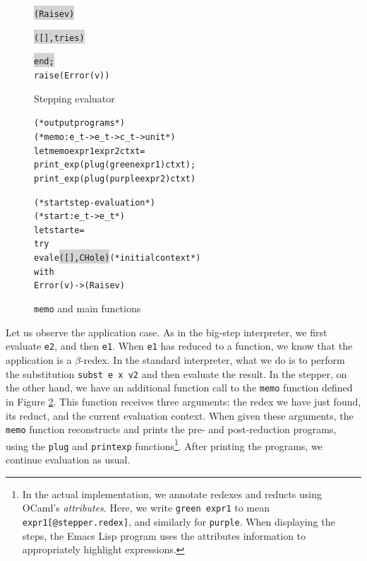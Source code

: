 \begin{figure}
\begin{alltt}
\end{alltt}
\vspace{-18pt}
\begin{alltt}
    \colorbox{lightgray}{           (Raise v)                    }
\end{alltt}
\vspace{-18pt}
\begin{alltt}
    \colorbox{lightgray}{           ([], tries)                  }
\end{alltt}
\vspace{-18pt}
\begin{alltt}
    \colorbox{lightgray}{end;                                    }
    raise (Error (v))
\end{alltt}
\caption{Stepping evaluator}
\label{figure:stepper}
\end{figure}

\begin{figure}
\begin{alltt}
(* output programs *)
(* memo : e_t -> e_t -> c_t -> unit *)
let memo expr1 expr2 ctxt =
  print_exp (plug (green expr1) ctxt);
  print_exp (plug (purple expr2) ctxt)

(* start step-evaluation *)
(* start : e_t -> e_t *)
let start e =
  try
    eval e \colorbox{lightgray}{([], CHole)}    (* initial context *)
  with
    Error (v) -> (Raise v)
\end{alltt}
\caption{\texttt{memo} and main functions}
\label{figure:memo}
\end{figure}

Let us observe the application case.  As in the big-step interpreter, we first evaluate \texttt{e2}, and then \texttt{e1}.  When \texttt{e1} has reduced to a function, we know that the application is a $\beta$-redex.  In the standard interpreter, what we do is to perform the substitution \texttt{subst e x v2} and then evaluate the result.  In the stepper, on the other hand, we have an additional function call to the \texttt{memo} function defined in Figure \ref{figure:memo}.  This function receives three arguments: the redex we have just found, its reduct, and the current evaluation context.  When given these arguments, the \texttt{memo} function reconstructs and prints the pre- and post-reduction programs, using the \texttt{plug} and \texttt{print\US exp} functions\footnote{In the actual implementation, we annotate redexes and reducts using OCaml's \emph{attributes}.  Here, we write \texttt{green expr1} to mean \texttt{expr1[@stepper.redex]}, and similarly for \texttt{purple}.  When displaying the steps, the Emacs Lisp program uses the attributes information to appropriately highlight expressions.}.  After printing the programs, we continue evaluation as usual.

